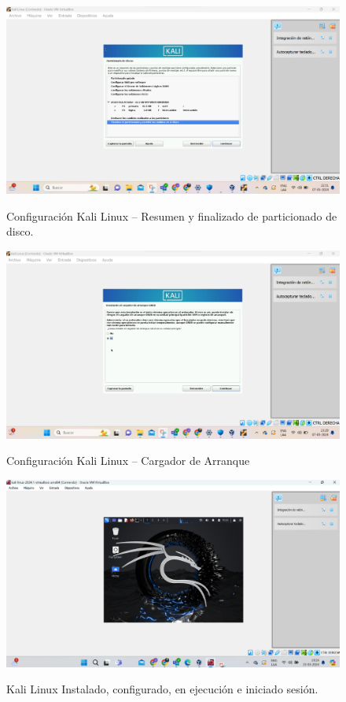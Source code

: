 \documentclass[stu, 11pt, letterpaper, donotrepeattitle, floatsintext, natbib]{apa7}
\begin{document}
\begin{figure}[H]
    \centering
    \caption{Configuración Kali Linux – Resumen y finalizado de particionado de disco.}
    \includegraphics[width=0.5\linewidth]{imagenCap2/22.png} %
    \label{fig:OverallEffect}
\end{figure}

\begin{figure}[H]
    \centering
    \caption{Configuración Kali Linux – Cargador de Arranque}
    \includegraphics[width=0.5\linewidth]{imagenCap2/23.png} %
    \label{fig:OverallEffect}
\end{figure}

\begin{figure}[H]
    \centering
    \caption{Kali Linux Instalado, configurado, en ejecución e iniciado sesión.}
    \includegraphics[width=0.5\linewidth]{imagenCap2/24.png} %
    \label{fig:OverallEffect}
\end{figure}
\end{document}
